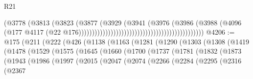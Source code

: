 \begin{lexlean}{R21}
\begin{coremodule}
                                                                          (@3778
                                                                            (@3813
                                                                              (@3823
                                                                                (@3877
                                                                                  (@3929
                                                                                    (@3941
                                                                                      (@3976
                                                                                        (@3986
                                                                                          (@3988
                                                                                            (@4096
                                                                                              (@177
                                                                                                @4117
                                                                                                (@22
                                                                                                  @176)))))))))))))))))))))))))))))))))))))))))))))))
@4206 := @175
    (@211
      (@222
        (@426
          (@1138
            (@1163
              (@1281
                (@1290
                  (@1303
                    (@1308
                      (@1419
                        (@1478
                          (@1529
                            (@1575
                              (@1645
                                (@1660
                                  (@1700
                                    (@1737
                                      (@1781
                                        (@1832
                                          (@1873
                                            (@1943
                                              (@1986
                                                (@1997
                                                  (@2015
                                                    (@2047
                                                      (@2074
                                                        (@2266
                                                          (@2284
                                                            (@2295
                                                              (@2316
                                                                (@2367

\end{coremodule}
\end{lexlean}
